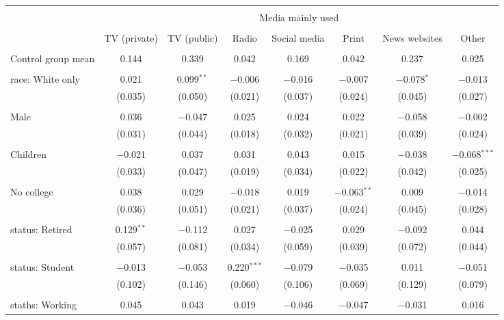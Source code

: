 
\begin{tabular}{@{\extracolsep{5pt}}lccccccc} 
\\[-1.8ex]\hline 
\hline \\[-1.8ex] 
 & \multicolumn{7}{c}{Media mainly used} \\ 
\cline{2-8} 
\\[-1.8ex] & TV (private) & TV (public) & Radio & Social media & Print & News websites & Other \\ 
\hline \\[-1.8ex] 
 Control group mean & 0.144 & 0.339 & 0.042 & 0.169 & 0.042 & 0.237 & 0.025  \\ \hline \\[-1.8ex] race: White only & 0.021 & 0.099$^{**}$ & $-$0.006 & $-$0.016 & $-$0.007 & $-$0.078$^{*}$ & $-$0.013 \\ 
  & (0.035) & (0.050) & (0.021) & (0.037) & (0.024) & (0.045) & (0.027) \\ 
  & & & & & & & \\ 
 Male & 0.036 & $-$0.047 & 0.025 & 0.024 & 0.022 & $-$0.058 & $-$0.002 \\ 
  & (0.031) & (0.044) & (0.018) & (0.032) & (0.021) & (0.039) & (0.024) \\ 
  & & & & & & & \\ 
 Children & $-$0.021 & 0.037 & 0.031 & 0.043 & 0.015 & $-$0.038 & $-$0.068$^{***}$ \\ 
  & (0.033) & (0.047) & (0.019) & (0.034) & (0.022) & (0.042) & (0.025) \\ 
  & & & & & & & \\ 
 No college & 0.038 & 0.029 & $-$0.018 & 0.019 & $-$0.063$^{**}$ & 0.009 & $-$0.014 \\ 
  & (0.036) & (0.051) & (0.021) & (0.037) & (0.024) & (0.045) & (0.028) \\ 
  & & & & & & & \\ 
 status: Retired & 0.129$^{**}$ & $-$0.112 & 0.027 & $-$0.025 & 0.029 & $-$0.092 & 0.044 \\ 
  & (0.057) & (0.081) & (0.034) & (0.059) & (0.039) & (0.072) & (0.044) \\ 
  & & & & & & & \\ 
 status: Student & $-$0.013 & $-$0.053 & 0.220$^{***}$ & $-$0.079 & $-$0.035 & 0.011 & $-$0.051 \\ 
  & (0.102) & (0.146) & (0.060) & (0.106) & (0.069) & (0.129) & (0.079) \\ 
  & & & & & & & \\ 
 staths: Working & 0.045 & 0.043 & 0.019 & $-$0.046 & $-$0.047 & $-$0.031 & 0.016 \\ 

\end{tabular}
